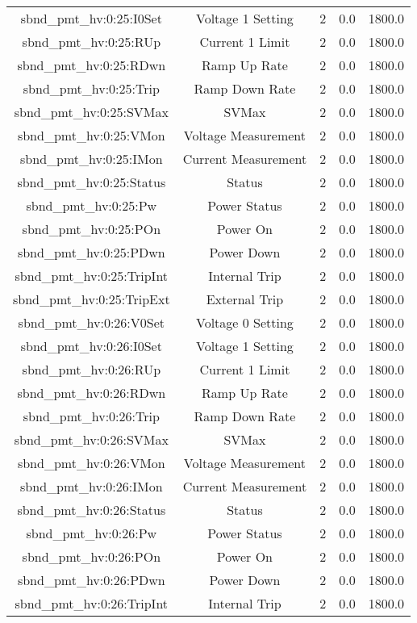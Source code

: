 \begin{table}[ptb]
\begin{tabular}{c | c c c c}
sbnd_pmt_hv:0:25:I0Set & Voltage 1 Setting & 2 & 0.0 & 1800.0\\ 
sbnd_pmt_hv:0:25:RUp & Current 1 Limit & 2 & 0.0 & 1800.0\\ 
sbnd_pmt_hv:0:25:RDwn & Ramp Up Rate & 2 & 0.0 & 1800.0\\ 
sbnd_pmt_hv:0:25:Trip & Ramp Down Rate & 2 & 0.0 & 1800.0\\ 
sbnd_pmt_hv:0:25:SVMax & SVMax & 2 & 0.0 & 1800.0\\ 
sbnd_pmt_hv:0:25:VMon & Voltage Measurement & 2 & 0.0 & 1800.0\\ 
sbnd_pmt_hv:0:25:IMon & Current Measurement & 2 & 0.0 & 1800.0\\ 
sbnd_pmt_hv:0:25:Status & Status & 2 & 0.0 & 1800.0\\ 
sbnd_pmt_hv:0:25:Pw & Power Status & 2 & 0.0 & 1800.0\\ 
sbnd_pmt_hv:0:25:POn & Power On & 2 & 0.0 & 1800.0\\ 
sbnd_pmt_hv:0:25:PDwn & Power Down & 2 & 0.0 & 1800.0\\ 
sbnd_pmt_hv:0:25:TripInt & Internal Trip & 2 & 0.0 & 1800.0\\ 
sbnd_pmt_hv:0:25:TripExt & External Trip & 2 & 0.0 & 1800.0\\ 
sbnd_pmt_hv:0:26:V0Set & Voltage 0 Setting & 2 & 0.0 & 1800.0\\ 
sbnd_pmt_hv:0:26:I0Set & Voltage 1 Setting & 2 & 0.0 & 1800.0\\ 
sbnd_pmt_hv:0:26:RUp & Current 1 Limit & 2 & 0.0 & 1800.0\\ 
sbnd_pmt_hv:0:26:RDwn & Ramp Up Rate & 2 & 0.0 & 1800.0\\ 
sbnd_pmt_hv:0:26:Trip & Ramp Down Rate & 2 & 0.0 & 1800.0\\ 
sbnd_pmt_hv:0:26:SVMax & SVMax & 2 & 0.0 & 1800.0\\ 
sbnd_pmt_hv:0:26:VMon & Voltage Measurement & 2 & 0.0 & 1800.0\\ 
sbnd_pmt_hv:0:26:IMon & Current Measurement & 2 & 0.0 & 1800.0\\ 
sbnd_pmt_hv:0:26:Status & Status & 2 & 0.0 & 1800.0\\ 
sbnd_pmt_hv:0:26:Pw & Power Status & 2 & 0.0 & 1800.0\\ 
sbnd_pmt_hv:0:26:POn & Power On & 2 & 0.0 & 1800.0\\ 
sbnd_pmt_hv:0:26:PDwn & Power Down & 2 & 0.0 & 1800.0\\ 
sbnd_pmt_hv:0:26:TripInt & Internal Trip & 2 & 0.0 & 1800.0\\ 

\end{tabular}
\end{table}
